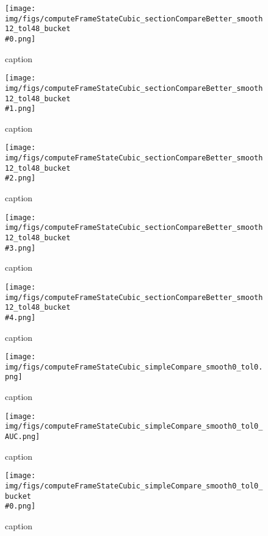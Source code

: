 %
\begin{figure}[!ht]
	\centering
	\texttt{[image: img/figs/computeFrameStateCubic\_sectionCompareBetter\_smooth12\_tol48\_bucket\\\#0.png]}
	\caption{caption}
	\label{fig:computeFrameStateCubic_sectionCompareBetter_smooth12_tol48_bucket\#0.png}
\end{figure}
%
\begin{figure}[!ht]
	\centering
	\texttt{[image: img/figs/computeFrameStateCubic\_sectionCompareBetter\_smooth12\_tol48\_bucket\\\#1.png]}
	\caption{caption}
	\label{fig:computeFrameStateCubic_sectionCompareBetter_smooth12_tol48_bucket\#1.png}
\end{figure}
%
\begin{figure}[!ht]
	\centering
	\texttt{[image: img/figs/computeFrameStateCubic\_sectionCompareBetter\_smooth12\_tol48\_bucket\\\#2.png]}
	\caption{caption}
	\label{fig:computeFrameStateCubic_sectionCompareBetter_smooth12_tol48_bucket\#2.png}
\end{figure}
%
\begin{figure}[!ht]
	\centering
	\texttt{[image: img/figs/computeFrameStateCubic\_sectionCompareBetter\_smooth12\_tol48\_bucket\\\#3.png]}
	\caption{caption}
	\label{fig:computeFrameStateCubic_sectionCompareBetter_smooth12_tol48_bucket\#3.png}
\end{figure}
%
\begin{figure}[!ht]
	\centering
	\texttt{[image: img/figs/computeFrameStateCubic\_sectionCompareBetter\_smooth12\_tol48\_bucket\\\#4.png]}
	\caption{caption}
	\label{fig:computeFrameStateCubic_sectionCompareBetter_smooth12_tol48_bucket\#4.png}
\end{figure}
%
\begin{figure}[!ht]
	\centering
	\texttt{[image: img/figs/computeFrameStateCubic\_simpleCompare\_smooth0\_tol0.png]}
	\caption{caption}
	\label{fig:computeFrameStateCubic_simpleCompare_smooth0_tol0.png}
\end{figure}
%
\begin{figure}[!ht]
	\centering
	\texttt{[image: img/figs/computeFrameStateCubic\_simpleCompare\_smooth0\_tol0\_AUC.png]}
	\caption{caption}
	\label{fig:computeFrameStateCubic_simpleCompare_smooth0_tol0_AUC.png}
\end{figure}
%
\begin{figure}[!ht]
	\centering
	\texttt{[image: img/figs/computeFrameStateCubic\_simpleCompare\_smooth0\_tol0\_bucket\\\#0.png]}
	\caption{caption}
	\label{fig:computeFrameStateCubic_simpleCompare_smooth0_tol0_bucket\#0.png}
\end{figure}
